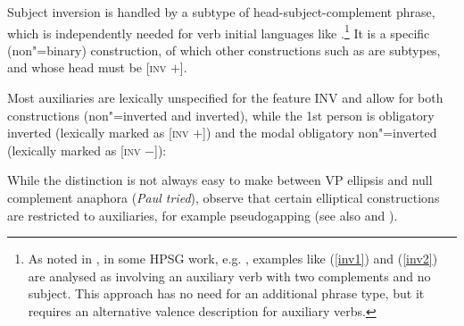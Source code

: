 \documentclass[output=paper
	        ,collection
	        ,collectionchapter
 	        ,biblatex
                ,babelshorthands
                ,newtxmath
                ,draftmode
                ,colorlinks, citecolor=brown
]{langscibook}
\begin{document}
Subject inversion is handled by a subtype of head-subject-complement phrase, which is independently
needed for verb initial languages like  \parencites{Borsley99c-u}{SWB2003a}.\footnote{As
  noted in \crossrefchapterw[\page \pageref{page-properties:aux-inversion}]{properties}, in some HPSG work, e.g. ,
  examples like (\ref{inv1}) and (\ref{inv2}) are analysed as involving an auxiliary verb with two
  complements and no subject. This approach has no need for an additional phrase type, but it
  requires an alternative valence description for auxiliary verbs.} It is a specific (non"=binary)
construction, of which other constructions such as  are subtypes,
and whose head must be [\textsc{inv} $+$].
\ea
{} \impl
{}
\z
       
Most auxiliaries are lexically unspecified for the feature INV and allow for both constructions
(non"=inverted and inverted), while the 1st person  is obligatory inverted (lexically
marked as [\textsc{inv} $+$]) and the modal  obligatory non"=inverted (lexically marked
as [\textsc{inv} $-$]):

\eal
{}
\zl

While the distinction is not always easy to make between VP ellipsis and null complement anaphora
(\textit{Paul tried}), \citeauthor{Sagetal2020} observe that certain elliptical constructions are
restricted to auxiliaries, for example pseudogapping (see also  and \citealt{Miller2014a-u}).

\eal
{}
\zl
\end{document}

